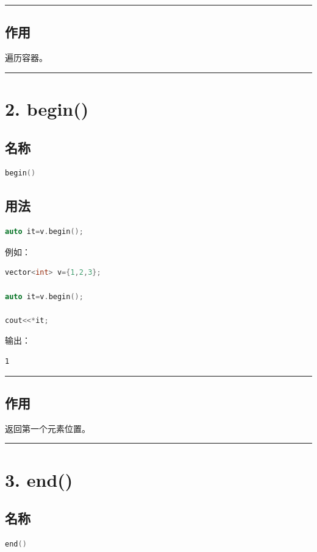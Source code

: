 \documentclass[9pt,twocolumn]{extarticle}
\begin{document}
\noindent\rule{\linewidth}{0.4pt}

\subsection{作用}
遍历容器。

\noindent\rule{\linewidth}{0.4pt}

\section{2. begin()}

\subsection{名称}
\begin{lstlisting}[language=C++]
begin()
\end{lstlisting}

\subsection{用法}
\begin{lstlisting}[language=C++]
auto it=v.begin();
\end{lstlisting}
例如：
\begin{lstlisting}[language=C++]
vector<int> v={1,2,3};

auto it=v.begin();

cout<<*it;
\end{lstlisting}
输出：
\begin{lstlisting}
1
\end{lstlisting}

\noindent\rule{\linewidth}{0.4pt}

\subsection{作用}
返回第一个元素位置。

\noindent\rule{\linewidth}{0.4pt}

\section{3. end()}

\subsection{名称}
\begin{lstlisting}[language=C++]
end()
\end{lstlisting}
\end{document}
